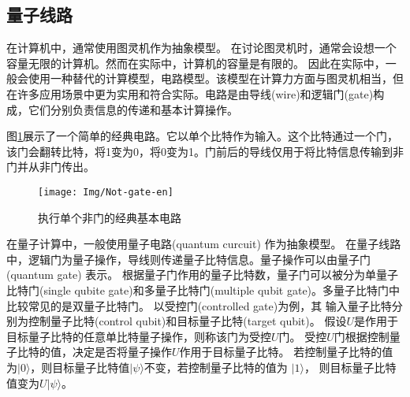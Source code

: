 \subsection{量子线路}
\label{sec-cir}
在计算机中，通常使用图灵机作为抽象模型。
在讨论图灵机时，通常会设想一个容量无限的计算机。然而在实际中，计算机的容量是有限的。
因此在实际中，一般会使用一种替代的计算模型，电路模型。该模型在计算力方面与图灵机相当，但在许多应用场景中更为实用和符合实际。电路是由导线(wire)和逻辑门(gate)构成，它们分别负责信息的传递和基本计算操作。
\begin{example}
    图\ref{fig-not}展示了一个简单的经典电路。它以单个比特作为输入。这个比特通过一个门，该门会翻转比特，将1变为0，将0变为1。门前后的导线仅用于将比特信息传输到非门并从非门传出。
\begin{figure}[htbp]
    \centering
    \texttt{[image: Img/Not-gate-en]}
    \caption{执行单个非门的经典基本电路}
    \label{fig-not}
\end{figure}
\end{example}

在量子计算中，一般使用量子电路(quantum curcuit) 作为抽象模型。
在量子线路中，逻辑门为量子操作，导线则传递量子比特信息。量子操作可以由量子门(quantum gate) 表示。
根据量子门作用的量子比特数，量子门可以被分为单量子比特门(single qubite gate)和多量子比特门(multiple qubit gate)。多量子比特门中比较常见的是双量子比特门。
以受控门(controlled gate)为例，其
输入量子比特分别为控制量子比特(control qubit)和目标量子比特(target qubit)。
假设$U $是作用于目标量子比特的任意单比特量子操作，则称该门为受控$U$门。
受控$U$门根据控制量子比特的值，决定是否将量子操作$U$作用于目标量子比特。
若控制量子比特的值为\(|0\rangle\)，则目标量子比特值\(|\psi\rangle\)不变，若控制量子比特的值为
\(|1\rangle\)， 则目标量子比特值变为\(U|\psi\rangle\)。

